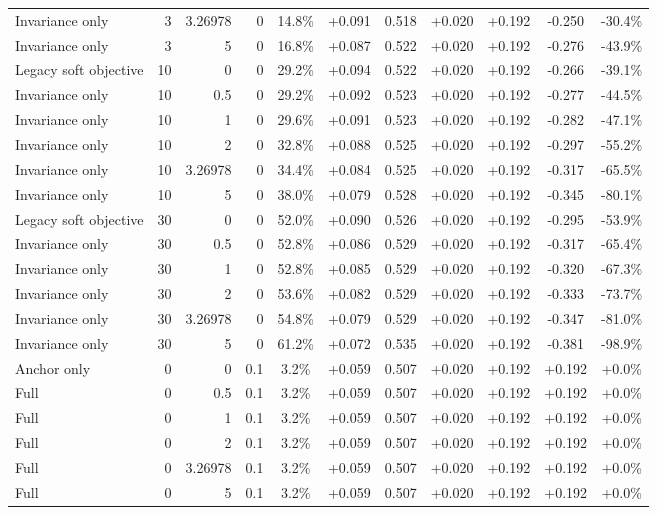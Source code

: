 \begin{table}[htbp]
\begin{tabular}{lrrrccccccc}
Invariance only & 3 & 3.26978 & 0 & 14.8\% & +0.091 & 0.518 & +0.020 & +0.192 & -0.250 & -30.4\% \\
Invariance only & 3 & 5 & 0 & 16.8\% & +0.087 & 0.522 & +0.020 & +0.192 & -0.276 & -43.9\% \\
Legacy soft objective & 10 & 0 & 0 & 29.2\% & +0.094 & 0.522 & +0.020 & +0.192 & -0.266 & -39.1\% \\
Invariance only & 10 & 0.5 & 0 & 29.2\% & +0.092 & 0.523 & +0.020 & +0.192 & -0.277 & -44.5\% \\
Invariance only & 10 & 1 & 0 & 29.6\% & +0.091 & 0.523 & +0.020 & +0.192 & -0.282 & -47.1\% \\
Invariance only & 10 & 2 & 0 & 32.8\% & +0.088 & 0.525 & +0.020 & +0.192 & -0.297 & -55.2\% \\
Invariance only & 10 & 3.26978 & 0 & 34.4\% & +0.084 & 0.525 & +0.020 & +0.192 & -0.317 & -65.5\% \\
Invariance only & 10 & 5 & 0 & 38.0\% & +0.079 & 0.528 & +0.020 & +0.192 & -0.345 & -80.1\% \\
Legacy soft objective & 30 & 0 & 0 & 52.0\% & +0.090 & 0.526 & +0.020 & +0.192 & -0.295 & -53.9\% \\
Invariance only & 30 & 0.5 & 0 & 52.8\% & +0.086 & 0.529 & +0.020 & +0.192 & -0.317 & -65.4\% \\
Invariance only & 30 & 1 & 0 & 52.8\% & +0.085 & 0.529 & +0.020 & +0.192 & -0.320 & -67.3\% \\
Invariance only & 30 & 2 & 0 & 53.6\% & +0.082 & 0.529 & +0.020 & +0.192 & -0.333 & -73.7\% \\
Invariance only & 30 & 3.26978 & 0 & 54.8\% & +0.079 & 0.529 & +0.020 & +0.192 & -0.347 & -81.0\% \\
Invariance only & 30 & 5 & 0 & 61.2\% & +0.072 & 0.535 & +0.020 & +0.192 & -0.381 & -98.9\% \\
Anchor only & 0 & 0 & 0.1 & 3.2\% & +0.059 & 0.507 & +0.020 & +0.192 & +0.192 & +0.0\% \\
Full & 0 & 0.5 & 0.1 & 3.2\% & +0.059 & 0.507 & +0.020 & +0.192 & +0.192 & +0.0\% \\
Full & 0 & 1 & 0.1 & 3.2\% & +0.059 & 0.507 & +0.020 & +0.192 & +0.192 & +0.0\% \\
Full & 0 & 2 & 0.1 & 3.2\% & +0.059 & 0.507 & +0.020 & +0.192 & +0.192 & +0.0\% \\
Full & 0 & 3.26978 & 0.1 & 3.2\% & +0.059 & 0.507 & +0.020 & +0.192 & +0.192 & +0.0\% \\
Full & 0 & 5 & 0.1 & 3.2\% & +0.059 & 0.507 & +0.020 & +0.192 & +0.192 & +0.0\% \\

\end{tabular}
\end{table}
